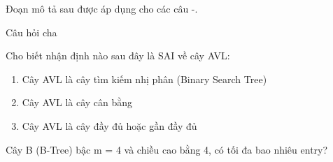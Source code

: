 \documentclass[11pt]{./internal/module/latex_compiler/latex_source/question/examdesign}
\begin{document}
\normalsize
\setlength{\beforesectsep}{10pt}

\begin{vnmultiplechoice}
\begin{block}[questions=2]
Đoạn mô tả sau được áp dụng cho các câu \thefirst-\thelast.

Câu hỏi cha
\begin{vnmultiplechoice}
\begin{question}
[2.1E] Cho biết nhận định nào sau đây là SAI về cây AVL:
\begin{enumerate}[label=\roman*.]
\item Cây AVL là cây tìm kiếm nhị phân (Binary Search Tree)
\item Cây AVL là cây cân bằng
\item Cây AVL là cây đầy đủ hoặc gần đầy đủ
\end{enumerate}
\datcot
\bonpa
{}
{}
{}
{}

\end{question}
\end{vnmultiplechoice}

\begin{vnmultiplechoice}
\begin{question}
[2.1M] Cây B (B-Tree) bậc m = 4 và chiều cao bằng 4, có tối đa bao nhiêu entry?
\datcot
\bonpa
{}
{}
{}
{}

\end{question}
\end{vnmultiplechoice}

\end{block}\end{vnmultiplechoice}
\end{document}
